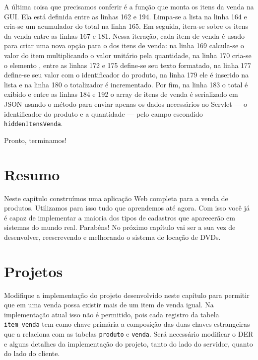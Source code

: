 A última coisa que precisamos conferir é a função  que monta os itens da venda na GUI. Ela está definida entre as linhas 162 e 194. Limpa-se a lista na linha 164 e cria-se um acumulador do total na linha 165. Em seguida, itera-se sobre os itens da venda entre as linhas 167 e 181. Nessa iteração, cada item de venda é usado para criar uma nova opção para o  dos itens de venda: na linha 169 calcula-se o valor do item multiplicando o valor unitário pela quantidade, na linha 170 cria-se o elemento , entre as linhas 172 e 175 define-se seu texto formatado, na linha 177 define-se seu valor com o identificador do produto, na linha 179 ele é inserido na lista e na linha 180 o totalizador é incrementado. Por fim, na linha 183 o total é exibido e entre as linhas 184 e 192 o array de itens de venda é serializado em JSON usando o método  para enviar apenas os dados necessários ao Servlet --- o identificador do produto e a quantidade --- pelo campo escondido \texttt{hiddenItensVenda}.

Pronto, terminamos!


\section{Resumo}

Neste capítulo construímos uma aplicação Web completa para a venda de produtos. Utilizamos para isso tudo que aprendemos até agora. Com isso você já é capaz de implementar a maioria dos tipos de cadastros que aparecerão em sistemas do mundo real. Parabéns! No próximo capítulo vai ser a sua vez de desenvolver, reescrevendo e melhorando o sistema de locação de DVDs. 


\section{Projetos}

\begin{projetoSemArquivo}{}{}{}
    Modifique a implementação do projeto desenvolvido neste capítulo para permitir que em uma venda possa existir mais de um item de venda igual. Na implementação atual isso não é permitido, pois cada registro da tabela \texttt{item\_venda} tem como chave primária a composição das duas chaves estrangeiras que a relaciona com as tabelas \texttt{produto} e \texttt{venda}. Será necessário modificar o DER e alguns detalhes da implementação do projeto, tanto do lado do servidor, quanto do lado do cliente.
\end{projetoSemArquivo}


